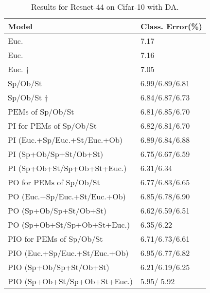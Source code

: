 \documentclass[10pt,journal,compsoc]{IEEEtran}
\theoremstyle{definition}
\theoremstyle{definition}
\theoremstyle{remark}
\theoremstyle{remark}
\theoremstyle{remark}
\begin{document}
\begin{table}[t]
	\centering
	\caption{Results for Resnet-44 on Cifar-10 with DA.}
	\begin{tabular}{C{4.95cm}C{2.5cm}}
		\toprule
		\toprule
		
		\textbf{Model} & \textbf{Class. Error(\%)} \\
		\midrule
		\midrule
		
		Euc. \cite{res_net}  & 7.17  \\
		Euc. \cite{oo16} & 7.16  \\
		Euc. $\dagger$ & {\color{red} 7.05}  \\
		Sp/Ob/St \cite{oo16} & 6.99/6.89/{{6.81}}\\
		Sp/Ob/St  $\dagger$ & 6.84/6.87/{ {6.73}}\\
		PEMs of	Sp/Ob/St   & 6.81/6.85/{ {6.70}}\\
	PI for PEMs of	Sp/Ob/St   & 6.82/6.81/{ {6.70}}\\
	  PI (Euc.+Sp/Euc.+St/Euc.+Ob) & 6.89/6.84/6.88  \\
		PI (Sp+Ob/Sp+St/Ob+St) & 6.75/6.67/6.59 \\	
		PI (Sp+Ob+St/Sp+Ob+St+Euc.)  & 6.31/6.34  \\	
		PO for PEMs of	Sp/Ob/St  & 6.77/6.83/{ {6.65}}\\	
		PO (Euc.+Sp/Euc.+St/Euc.+Ob) & 6.85/6.78/6.90  \\		
		PO (Sp+Ob/Sp+St/Ob+St) & 6.62/6.59/6.51  \\	
		PO (Sp+Ob+St/Sp+Ob+St+Euc.)  & 6.35/6.22 \\		
	PIO for PEMs of	Sp/Ob/St   & 6.71/6.73/{ {6.61}}\\					
		PIO (Euc.+Sp/Euc.+St/Euc.+Ob) & 6.95/6.77/6.82  \\		
PIO (Sp+Ob/Sp+St/Ob+St) & 6.21/6.19/6.25  \\
PIO (Sp+Ob+St/Sp+Ob+St+Euc.)  & 5.95/{\color{blue} 5.92 } \\		
		\bottomrule
		\bottomrule
	\end{tabular}%
	\label{tab:res10}%
\end{table}%
\end{document}
